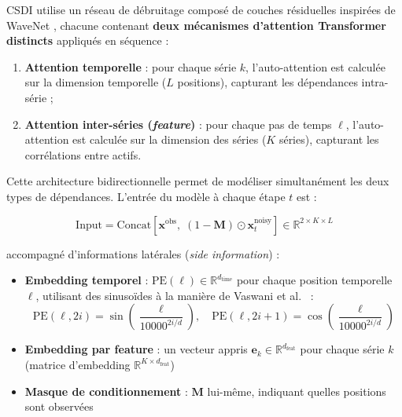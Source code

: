 \documentclass[12pt,a4paper]{article}
\newcommand{\R}{\mathbb{R}}
\newcommand{\bx}{\bm{x}}
\begin{document}
CSDI utilise un r\'eseau de d\'ebruitage compos\'e de couches r\'esiduelles inspir\'ees de WaveNet \cite{oord2016}, chacune contenant \textbf{deux m\'ecanismes d'attention Transformer distincts} appliqu\'es en s\'equence :
\begin{enumerate}
    \item \textbf{Attention temporelle} : pour chaque s\'erie $k$, l'auto-attention est calcul\'ee sur la dimension temporelle ($L$ positions), capturant les d\'ependances intra-s\'erie ;
    \item \textbf{Attention inter-s\'eries (\textit{feature})} : pour chaque pas de temps $\ell$, l'auto-attention est calcul\'ee sur la dimension des s\'eries ($K$ s\'eries), capturant les corr\'elations entre actifs.
\end{enumerate}
Cette architecture bidirectionnelle permet de mod\'eliser simultan\'ement les deux types de d\'ependances. L'entr\'ee du mod\`ele \`a chaque \'etape $t$ est :

\begin{equation}
\text{Input} = \text{Concat}\left[\bx^{\text{obs}},\; (1-\bm{M}) \odot \bx_t^{\text{noisy}}\right] \in \R^{2 \times K \times L}
\end{equation}

accompagn\'e d'informations lat\'erales (\textit{side information}) :
\begin{itemize}
    \item \textbf{Embedding temporel} : $\text{PE}(\ell) \in \R^{d_{\text{time}}}$ pour chaque position temporelle $\ell$, utilisant des sinuso\"ides \`a la mani\`ere de Vaswani et al.\ \cite{vaswani2017} :
    \begin{equation}
    \text{PE}(\ell, 2i) = \sin\left(\frac{\ell}{10000^{2i/d}}\right), \quad \text{PE}(\ell, 2i+1) = \cos\left(\frac{\ell}{10000^{2i/d}}\right)
    \end{equation}
    \item \textbf{Embedding par feature} : un vecteur appris $\bm{e}_k \in \R^{d_{\text{feat}}}$ pour chaque s\'erie $k$ (matrice d'embedding $\R^{K \times d_{\text{feat}}}$)
    \item \textbf{Masque de conditionnement} : $\bm{M}$ lui-m\^eme, indiquant quelles positions sont observ\'ees
\end{itemize}
\end{document}
